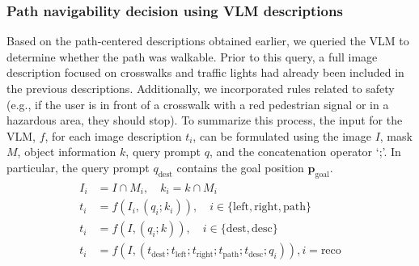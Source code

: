 \subsubsection{Path navigability decision using VLM descriptions}
Based on the path-centered descriptions obtained earlier, we queried the VLM to determine whether the path was walkable. Prior to this query, a full image description focused on crosswalks and traffic lights had already been included in the previous descriptions. Additionally, we incorporated rules related to safety (e.g., if the user is in front of a crosswalk with a red pedestrian signal or in a hazardous area, they should stop). 
To summarize this process, the input for the VLM, $f$, for each image description $t_i$, can be formulated using the image $I$, mask $M$, object information $k$, query prompt $q$, and the concatenation operator `;'. In particular, the query prompt $q_{\text{dest}}$ contains the goal position $\mathbf{p}_{\text{goal}}$.
\begin{align}
\begin{split}
    I_i &= I \cap M_i, \quad k_i = k \cap M_i \\
    t_i &= f(I_i, (q_i ; k_i)), \quad i \in \{\text{left}, \text{right}, \text{path}\} \\
    t_i &= f(I, (q_i ; k)), \quad i \in \{\text{dest}, \text{desc}\} \\
    t_i &= f(I, (t_{\text{dest}} ; t_{\text{left}} ; t_{\text{right}} ; t_{\text{path}} ; t_{\text{desc}} ; q_i)),  i = \text{reco}
\end{split}
\end{align}
